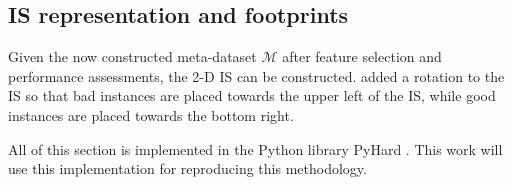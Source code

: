 \subsection{IS representation and footprints}

Given the now constructed meta-dataset $\mathcal{M}$ after feature selection and performance assessments, the 2-D IS can be constructed.  added a rotation to the IS so that bad instances are placed towards the upper left of the IS, while good instances are placed towards the bottom right.

All of this section is implemented in the Python library PyHard \cite{Lorena2022}. This work will use this implementation for reproducing this methodology.